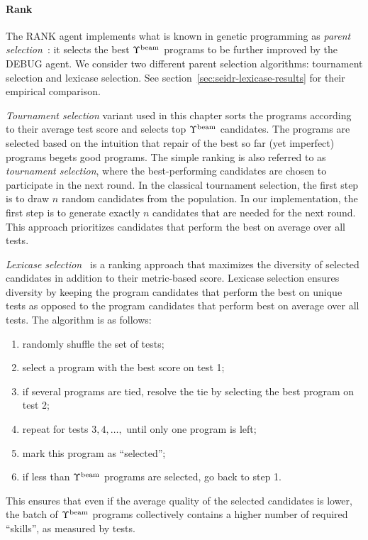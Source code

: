 \paragraph{Rank}

The RANK agent implements what is known in genetic programming as \emph{parent selection}~\cite{koza1994:genetic}: it selects the best $\Upsilon^\text{beam}{}$ programs to be further improved by the DEBUG agent.
We consider two different parent selection algorithms: tournament selection and lexicase selection. 
See section~\ref{sec:seidr-lexicase-results} for their empirical comparison.

\emph{Tournament selection} variant used in this chapter sorts the programs according to their average test score and selects top $\Upsilon^\text{beam}{}$ candidates. 
The programs are selected based on the intuition that repair of the best so far (yet imperfect) programs begets good programs. 
The simple ranking is also referred to as \emph{tournament selection}, where the best-performing candidates are chosen to participate in the next round.  
In the classical tournament selection, the first step is to draw $n$ random candidates from the population. 
In our implementation, the first step is to generate exactly $n$ candidates that are needed for the next round. 
This approach prioritizes candidates that perform the best on average over all tests.

\emph{Lexicase selection}~\cite{helmuth2015:solving} is a ranking approach that maximizes the diversity of selected candidates in addition to their metric-based score.
Lexicase selection ensures diversity by keeping the program candidates that perform the best on unique tests as opposed to the program candidates that perform best on average over all tests.
The algorithm is as follows:
\begin{enumerate}

\setlength{\parskip}{0pt}
\setlength\itemsep{0pt}

    \item randomly shuffle the set of tests;
    \item select a program with the best score on test 1;
    \item if several programs are tied, resolve the tie by selecting the best program on test 2;
    \item repeat for tests $3,4,\dots,$ until only one program is left;
    \item mark this program as ``selected'';
    \item if less than $\Upsilon^\text{beam}$ programs are selected, go back to step 1.
\end{enumerate}
This ensures that even if the average quality of the selected candidates is lower, the batch of $\Upsilon^\text{beam}{}$ programs collectively contains a higher number of required ``skills'', as measured by tests.



